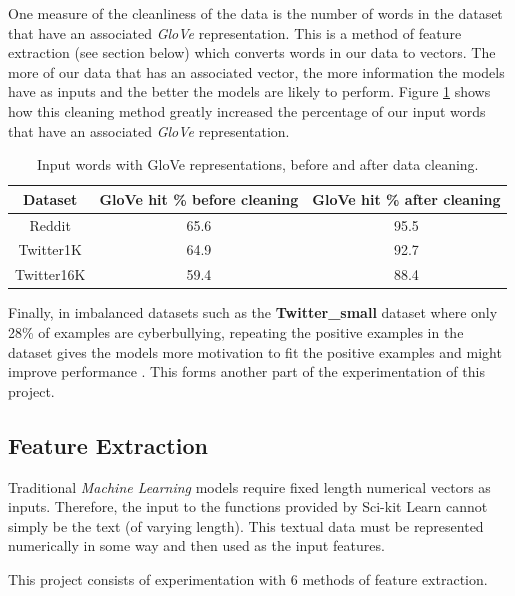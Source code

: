 \documentclass[12pt,a4paper]{article}
\begin{document}
One measure of the cleanliness of the data is the number of words in the dataset that have an associated \textit{GloVe} representation. This is a method of feature extraction (see section below) which converts words in our data to vectors. The more of our data that has an associated vector, the more information the models have as inputs and the better the models are likely to perform. Figure \ref{glove} shows how this cleaning method greatly increased the percentage of our input words that have an associated \textit{GloVe} representation.

\begin{table}[htb]
	\centering
	\caption{Input words with GloVe representations, before and after data cleaning.}
	\vspace*{6pt}
	\label{glove}
	\begin{tabular}{ccc}\hline\hline
		\textbf{Dataset} & \textbf{GloVe hit \% before cleaning} & \textbf{GloVe hit \% after cleaning} \\ \hline
		Reddit & 65.6 & 95.5 \\ 
		Twitter1K & 64.9 & 92.7 \\
		Twitter16K & 59.4 & 88.4 \\
	\end{tabular}
\end{table}

Finally, in imbalanced datasets such as the \textbf{Twitter\_small} dataset where only 28\% of examples are cyberbullying, repeating the positive examples in the dataset gives the models more motivation to fit the positive examples and might improve performance \cite{Reynolds}. This forms another part of the experimentation of this project.


\subsection{Feature Extraction}
Traditional \textit{Machine Learning} models require fixed length numerical vectors as inputs. Therefore, the input to the functions provided by Sci-kit Learn cannot simply be the text (of varying length). This textual data must be represented numerically in some way and then used as the input features.

This project consists of experimentation with 6 methods of feature extraction.
\end{document}
